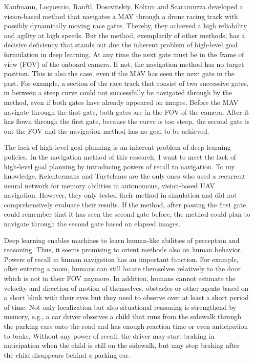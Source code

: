 Kaufmann, Loquercio, Ranftl, Dosovitskiy, Koltun and Scaramuzza\cite{Kaufmann2018}
developed a vision-based method that navigates a MAV through a drone racing track with possibly dynamically moving race gates.
Thereby, they achieved a high reliability and agility at high speeds.
But the method, exemplarily of other methods, has a decisive deficiency that stands out 
due the inherent problem of high-level goal formulation in deep learning.
At any time the next gate must be in the frame of view (FOV) of the onboard camera. 
If not, the navigation method has no target position.
This is also the case, even if the MAV has seen the next gate in the past.
For example, a section of the race track that consist of two successive gates, in between a steep curve
could not successfully be navigated through by the method, even if both gates have already appeared on images.
Before the MAV navigate through the first gate, both gates are in the FOV of the camera.
After it has flown through the first gate, because the curve is too steep, the second gate is out the FOV 
and the navigation method has no goal to be achieved.

The lack of high-level goal planning is an inherent problem of deep learning policies.
In the navigation method of this research, I want to meet the lack of high-level goal planning 
by introducing powers of recall to navigation.
To my knowledge, Kelchtermans and Tuytelaars \cite{Kelchtermans2017}
are the only ones who used a recurrent neural network for memory abilities in autonomous, vision-based UAV navigation. \cite{Shakeri2019}
However, they only tested their method in simulation and did not comprehensively evaluate their results.
If the method, after passing the first gate, could remember that it has seen the second gate before,
the method could plan to navigate through the second gate based on elapsed images.

Deep learning enables machines to learn human-like abilities of perception and reasoning.
Thus, it seems promising to orient methods also on human behavior.
Powers of recall in human navigation has an important function.
For example, after entering a room, humans can still locate themselves relatively to the door which is not in their FOV anymore.
In addition, humans cannot estimate the velocity and direction of motion of themselves, obstacles or other agents
based on a short blink with their eyes but they need to observe over at least a short period of time.
Not only localization but also situational reasoning is strengthend by memory,
e.g., a car driver observes a child that runs from the sidewalk through the parking cars onto the road
and has enough reaction time or even anticipation to brake.
Without any power of recall, the driver may start braking in anticipation
when the child is still on the sidewalk, but may stop braking after the child disappears behind a parking car.

